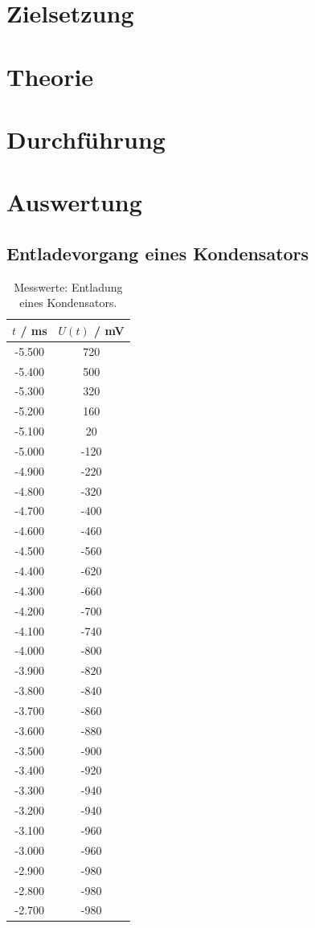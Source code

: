 \section{Zielsetzung}

\section{Theorie}

\section{Durchführung}

\section{Auswertung}
\subsection{Entladevorgang eines Kondensators}

\begin{table}
  \centering
  \caption{Messwerte: Entladung eines Kondensators.}
  \label{table1}
  \begin{tabular}{c c}
    \toprule
    $t$ / ms & $U(t)$ / mV \\
    \midrule
    -5.500 & 720\\
    -5.400 & 500\\
    -5.300 & 320\\
    -5.200 & 160\\
    -5.100 & 20\\
    -5.000 & -120\\
    -4.900 & -220\\
    -4.800 & -320\\
    -4.700 & -400\\
    -4.600 & -460\\
    -4.500 & -560\\
    -4.400 & -620\\
    -4.300 & -660\\
    -4.200 & -700\\
    -4.100 & -740\\
    -4.000 & -800\\
    -3.900 & -820\\
    -3.800 & -840\\
    -3.700 & -860\\
    -3.600 & -880\\
    -3.500 & -900\\
    -3.400 & -920\\
    -3.300 & -940\\
    -3.200 & -940\\
    -3.100 & -960\\
    -3.000 & -960\\
    -2.900 & -980\\
    -2.800 & -980\\
    -2.700 & -980\\
    \bottomrule
  \end{tabular}
\end{table}

